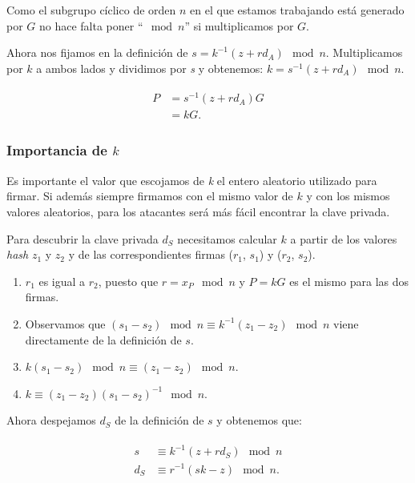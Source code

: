 \documentclass[11pt]{article}
\begin{document}
Como el subgrupo cíclico de orden $n$ en el que estamos trabajando está generado por $G$ no hace falta poner ``$\mod n$'' si multiplicamos por $G$.


Ahora nos fijamos en la definición de $s = k^{-1}(z + r d_A) \mod n$. Multiplicamos por $k$ a ambos lados y dividimos por \textit{s} y obtenemos: $k = s^{-1} (z + r d_A) \mod n$.

\begin{align}
\begin{split}
P &= s^{-1}(z + r d_A) G\\
&= kG.
\end{split}
\end{align}


\subsubsection*{Importancia de $k$}

Es importante el valor que escojamos de \textit{k} el entero aleatorio utilizado para firmar. Si además siempre firmamos con el mismo valor de $k$ y con los mismos valores aleatorios, para los atacantes será más fácil encontrar la clave privada.

Para descubrir la clave privada $d_S$ necesitamos calcular $k$ a partir de los valores \textit{hash} $z_1$ y $z_2$ y de las correspondientes firmas ($r_1$, $s_1$) y ($r_2$, $s_2$).


\begin{enumerate}
	\item $r_1$ es igual a $r_2$, puesto que $ r = x_P \mod n$ y $P = kG$ es el mismo para las dos firmas.
	\item Observamos que  $(s_1 - s_2) \mod n \equiv k^{-1} (z_1 - z_2) \mod n$ viene directamente de la definición de $s$.
	\item $k(s_1 - s_2) \mod n \equiv (z_1 - z_2) \mod n$.
	\item $k  \equiv (z_1 - z_2) (s_1 -s_2)^{-1} \mod n$.
\end{enumerate}

Ahora despejamos $d_S$ de la definición de $s$ y obtenemos que:


\begin{align}
\begin{split}
s &\equiv k^{-1}(z + r d_S) \mod n\\
d_S &\equiv r^{-1}(sk - z) \mod n.\\
\end{split}
\end{align}
\end{document}
